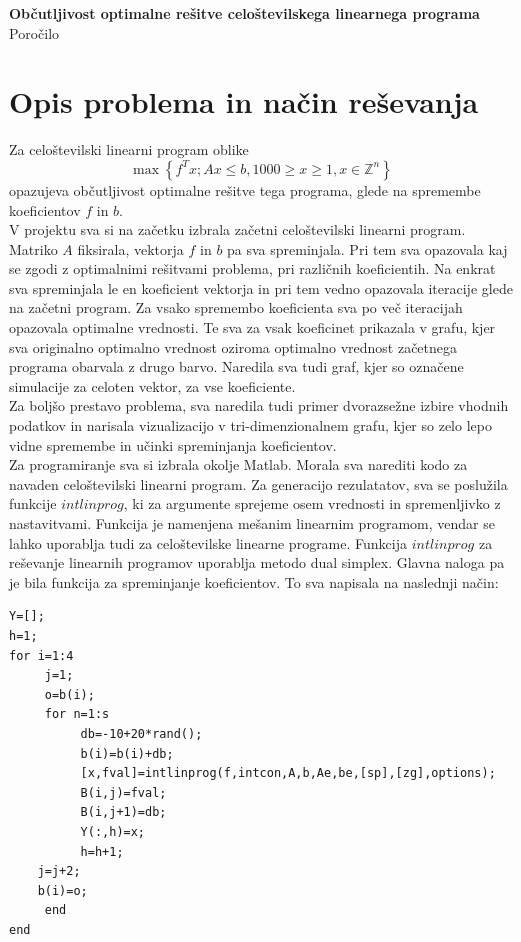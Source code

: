 \documentclass[a4paper,12pt]{article}
\begin{document}
\begin{center}
\huge \textbf{Občutljivost optimalne rešitve celoštevilskega linearnega programa}
\\[2cm]
\LARGE Poročilo
\\[2cm]
\end{center}


\section{Opis problema in način reševanja}


Za celoštevilski linearni program oblike
$$\max\left\{f^Tx; Ax \leq b, 1000 \geq x \geq 1, x \in \mathbb{Z}^n \right\}$$
opazujeva občutljivost optimalne rešitve tega programa, glede na spremembe koeficientov $f$ in $b$. 
\\[0.5cm]
V projektu sva si na začetku izbrala začetni celoštevilski linearni program. Matriko $A$ fiksirala, vektorja $f$ in $b$ pa sva spreminjala. Pri tem sva opazovala kaj se zgodi z optimalnimi rešitvami problema, pri različnih koeficientih. Na enkrat sva spreminjala le en koeficient vektorja in pri tem vedno opazovala iteracije glede na začetni program. Za vsako spremembo koeficienta sva po več iteracijah opazovala optimalne vrednosti. Te sva za vsak koeficinet prikazala v grafu, kjer sva originalno optimalno vrednost oziroma optimalno vrednost začetnega programa obarvala z drugo barvo. Naredila sva tudi graf, kjer so označene simulacije za celoten vektor, za vse koeficiente.
\\[0.5cm]
Za boljšo prestavo problema, sva naredila tudi primer dvorazsežne izbire vhodnih podatkov in narisala vizualizacijo v tri-dimenzionalnem grafu, kjer so zelo lepo vidne spremembe in učinki spreminjanja koeficientov.
\\[1cm]
Za programiranje sva si izbrala okolje Matlab. Morala sva narediti kodo za navaden celoštevilski linearni program. Za generacijo rezulatatov, sva se poslužila funkcije $intlinprog$, ki za argumente sprejeme osem vrednosti in spremenljivko z nastavitvami. Funkcija je namenjena mešanim linearnim programom, vendar se lahko uporablja tudi za celoštevilske linearne programe. Funkcija $intlinprog$ za reševanje linearnih programov uporablja metodo dual simplex. Glavna naloga pa je bila funkcija za spreminjanje koeficientov. To sva napisala na naslednji način:
\newpage
\lstset{language=Matlab} 
\begin{lstlisting}
Y=[];
h=1;
for i=1:4
     j=1;
     o=b(i);
     for n=1:s
          db=-10+20*rand();
          b(i)=b(i)+db;
          [x,fval]=intlinprog(f,intcon,A,b,Ae,be,[sp],[zg],options);
          B(i,j)=fval;
          B(i,j+1)=db;
          Y(:,h)=x;
          h=h+1;
	j=j+2;
	b(i)=o;
     end
end
\end{lstlisting}
\end{document}

